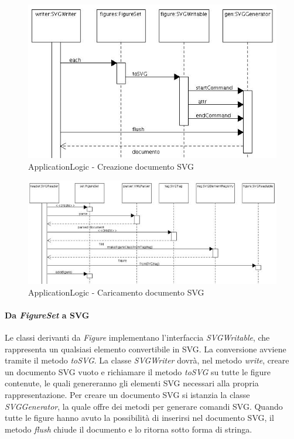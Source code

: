 \begin{figure}[!ht]
\centering
\includegraphics{ScritturaSVG.jpg}
\caption{ApplicationLogic - Creazione documento SVG}
\end{figure}

\begin{figure}[!ht]
\centering
\includegraphics{LetturaSVG.jpg}
\caption{ApplicationLogic - Caricamento documento SVG}
\end{figure}

\paragraph{Da \textit{FigureSet} a SVG}
Le classi derivanti da \textit{Figure} implementano l'interfaccia \textit{SVGWritable}, che rappresenta un qualsiasi elemento convertibile in SVG. La conversione avviene tramite il metodo \textit{toSVG}. La classe \textit{SVGWriter} dovr\`a, nel metodo \textit{write}, creare un documento SVG vuoto e richiamare il metodo \textit{toSVG} su tutte le figure contenute, le quali genereranno gli elementi SVG necessari alla propria rappresentazione. Per creare un documento SVG si istanzia la classe \textit{SVGGenerator}, la quale offre dei metodi per generare comandi SVG. Quando tutte le figure hanno avuto la possibilit\`a di inserirsi nel documento SVG, il metodo \textit{flush} chiude il documento e lo ritorna sotto forma di stringa.
